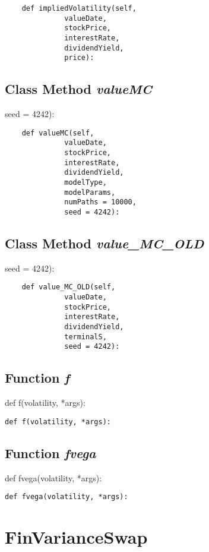 \documentclass[twoside,11pt]{book}
\begin{document}
\begin{lstlisting}
    def impliedVolatility(self,
              valueDate,
              stockPrice,
              interestRate,
              dividendYield,
              price):
\end{lstlisting}

\subsection{Class Method {\it valueMC}}
seed = 4242):

\begin{lstlisting}
    def valueMC(self,
              valueDate,
              stockPrice,
              interestRate,
              dividendYield,
              modelType, 
              modelParams,
              numPaths = 10000,
              seed = 4242):
\end{lstlisting}

\subsection{Class Method {\it value\_MC\_OLD}}
seed = 4242):

\begin{lstlisting}
    def value_MC_OLD(self,
              valueDate,
              stockPrice,
              interestRate,
              dividendYield,
              terminalS,
              seed = 4242):
\end{lstlisting}

\subsection{Function {\it f}}
def f(volatility, *args):

\begin{lstlisting}
def f(volatility, *args):
\end{lstlisting}

\subsection{Function {\it fvega}}
def fvega(volatility, *args):

\begin{lstlisting}
def fvega(volatility, *args):
\end{lstlisting}

\newpage
\section{FinVarianceSwap}
\end{document}
